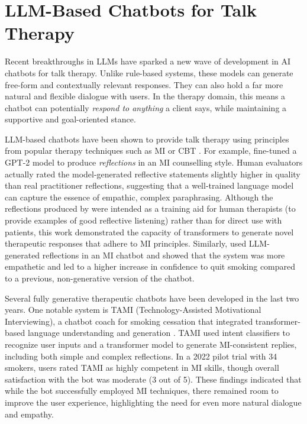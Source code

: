 \section{LLM-Based Chatbots for Talk Therapy}
Recent breakthroughs in LLMs have sparked a new wave of development in AI chatbots for
talk therapy. Unlike rule-based systems, these models can generate free-form and
contextually relevant responses. They can also hold a far more natural and flexible
dialogue with users. In the therapy domain, this means a chatbot can potentially
\textit{respond to anything} a client says, while maintaining a supportive and
goal-oriented stance.

LLM-based chatbots have been shown to provide talk therapy using principles from
popular therapy techniques such as MI or CBT
\cite{mahmood-etal-2025-fully,kian2024can,Ye2025}. For example,
\citet{shen-etal-2020-counseling} fine-tuned a GPT-2 model to produce
\emph{reflections} in an MI counselling style. Human evaluators actually rated the
model-generated reflective statements slightly higher in quality than real practitioner
reflections, suggesting that a well-trained language model can capture the essence of
empathic, complex paraphrasing. Although the reflections produced by
\citet{shen-etal-2020-counseling} were intended as a training aid for human therapists
(to provide examples of good reflective listening) rather than for direct use with
patients, this work demonstrated the capacity of transformers to generate novel
therapeutic responses that adhere to MI principles. Similarly, \citet{brown2023mi} used
LLM-generated reflections in an MI chatbot and showed that the system was more
empathetic and led to a higher increase in confidence to quit smoking compared to a
previous, non-generative version of the chatbot.

Several fully generative therapeutic chatbots have been developed in the last two
years. One notable system is TAMI (Technology-Assisted Motivational Interviewing), a
chatbot coach for smoking cessation that integrated transformer-based language
understanding and generation \cite{SAIYED2022121}. TAMI used intent classifiers to
recognize user inputs and a transformer model to generate MI-consistent replies,
including both simple and complex reflections. In a 2022 pilot trial with 34 smokers,
users rated TAMI as highly competent in MI skills, though overall satisfaction with the
bot was moderate (3 out of 5). These findings indicated that while the bot successfully
employed MI techniques, there remained room to improve the user experience,
highlighting the need for even more natural dialogue and empathy.


